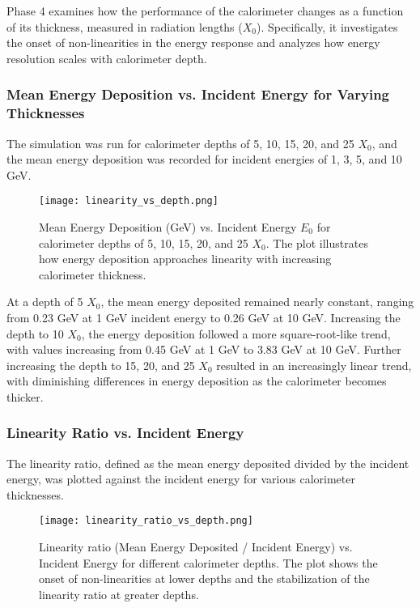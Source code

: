 \documentclass[twocolumn]{aastex631}
\begin{document}
Phase 4 examines how the performance of the calorimeter changes as a function of its thickness, measured in radiation lengths (\(X_0\)). Specifically, it investigates the onset of non-linearities in the energy response and analyzes how energy resolution scales with calorimeter depth.

\subsubsection{Mean Energy Deposition vs. Incident Energy for Varying Thicknesses}

The simulation was run for calorimeter depths of 5, 10, 15, 20, and 25 \(X_0\), and the mean energy deposition was recorded for incident energies of 1, 3, 5, and 10 GeV.

\begin{figure}[htp]
    \centering
    \texttt{[image: linearity\_vs\_depth.png]}
    \caption{Mean Energy Deposition (GeV) vs. Incident Energy \(E_0\) for calorimeter depths of 5, 10, 15, 20, and 25 \(X_0\). The plot illustrates how energy deposition approaches linearity with increasing calorimeter thickness.}
    \label{fig:mean_energy_deposition_depth}
\end{figure}

At a depth of 5 \(X_0\), the mean energy deposited remained nearly constant, ranging from 0.23 GeV at 1 GeV incident energy to 0.26 GeV at 10 GeV. Increasing the depth to 10 \(X_0\), the energy deposition followed a more square-root-like trend, with values increasing from 0.45 GeV at 1 GeV to 3.83 GeV at 10 GeV. Further increasing the depth to 15, 20, and 25 \(X_0\) resulted in an increasingly linear trend, with diminishing differences in energy deposition as the calorimeter becomes thicker.

\subsubsection{Linearity Ratio vs. Incident Energy}

The linearity ratio, defined as the mean energy deposited divided by the incident energy, was plotted against the incident energy for various calorimeter thicknesses.

\begin{figure}[htp]
    \centering
    \texttt{[image: linearity\_ratio\_vs\_depth.png]}
    \caption{Linearity ratio (Mean Energy Deposited / Incident Energy) vs. Incident Energy for different calorimeter depths. The plot shows the onset of non-linearities at lower depths and the stabilization of the linearity ratio at greater depths.}
    \label{fig:linearity_ratio_vs_depth}
\end{figure}
\end{document}
